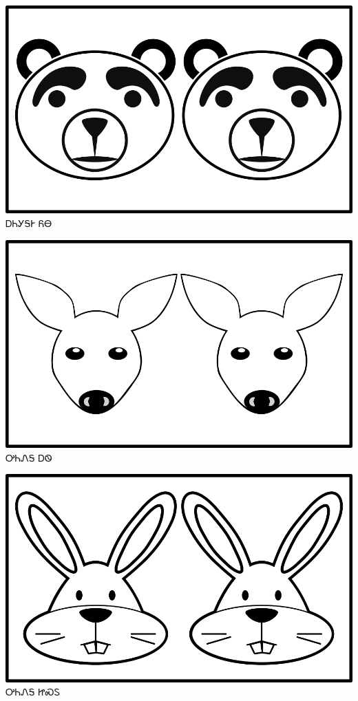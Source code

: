 \documentclass[avery5371]{flashcards}%
\begin{document}
\begin{flashcard}{
\includegraphics[width=0.95\columnwidth,height=.51\columnwidth,keepaspectratio]{../artwork/objects-animate/anitali-yona}
}\Huge ᎠᏂᎩᎦᎨ ᏲᎾ
\end{flashcard}

\begin{flashcard}{
\includegraphics[width=0.95\columnwidth,height=.51\columnwidth,keepaspectratio]{../artwork/objects-animate/anitali-ahwi}
}\Huge ᎤᏂᏁᎦ ᎠᏫ
\end{flashcard}

\begin{flashcard}{
\includegraphics[width=0.95\columnwidth,height=.51\columnwidth,keepaspectratio]{../artwork/objects-animate/anitali-jisdu}
}\Huge ᎤᏂᏁᎦ ᏥᏍᏚ
\end{flashcard}
\end{document}
